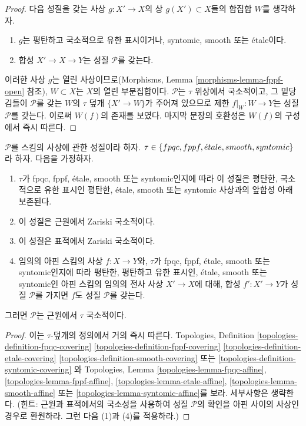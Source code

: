 \begin{proof}
다음 성질을 갖는 사상 $g : X' \to X$의 상 $g(X') \subset X$들의 합집합
$W$를 생각하자.
\begin{enumerate}
\item $g$는 평탄하고 국소적으로 유한 표시이거나, syntomic, smooth 또는
\'etale이다.
\item 합성 $X' \to X \to Y$는 성질 $\mathcal{P}$를 갖는다.
\end{enumerate}
이러한 사상 $g$는 열린 사상이므로(Morphisms, Lemma
\ref{morphisms-lemma-fppf-open} 참조), $W \subset X$는 $X$의 열린
부분집합이다. $\mathcal{P}$는 $\tau$ 위상에서 국소적이고, 그 밑당김들이
$\mathcal{P}$를 갖는 $W$의 $\tau$ 덮개 $\{X' \to W\}$가 주어져
있으므로 제한 $f|_W : W \to Y$는 성질 $\mathcal{P}$를 갖는다. 이로써
$W(f)$의 존재를 보였다. 마지막 문장의 호환성은 $W(f)$의 구성에서 즉시
따른다.
\end{proof}

\begin{lemma}
\label{lemma-properties-morphisms-local-source}
$\mathcal{P}$를 스킴의 사상에 관한 성질이라 하자.
$\tau \in \{fpqc, \linebreak[0] fppf, \linebreak[0]
\etale, \linebreak[0] smooth, \linebreak[0] syntomic\}$라 하자. 다음을
가정하자.
\begin{enumerate}
\item $\tau$가 fpqc, fppf, \'etale, smooth 또는 syntomic인지에 따라 이
성질은 평탄한, 국소적으로 유한 표시인 평탄한, \'etale, smooth 또는
syntomic 사상과의 앞합성 아래 보존된다.
\item 이 성질은 근원에서 Zariski 국소적이다.
\item 이 성질은 표적에서 Zariski 국소적이다.
\item 임의의 아핀 스킴의 사상 $f : X \to Y$와, $\tau$가 fpqc, fppf,
\'etale, smooth 또는 syntomic인지에 따라 평탄한, 평탄하고 유한 표시인,
\'etale, smooth 또는 syntomic인 아핀 스킴의 임의의 전사 사상
$X' \to X$에 대해, 합성 $f' : X' \to Y$가 성질 $\mathcal{P}$를
가지면 $f$도 성질 $\mathcal{P}$를 갖는다.
\end{enumerate}
그러면 $\mathcal{P}$는 근원에서 $\tau$ 국소적이다.
\end{lemma}

\begin{proof}
이는 $\tau$-덮개의 정의에서 거의 즉시 따른다. Topologies, Definition
\ref{topologies-definition-fpqc-covering}
\ref{topologies-definition-fppf-covering}
\ref{topologies-definition-etale-covering}
\ref{topologies-definition-smooth-covering} 또는
\ref{topologies-definition-syntomic-covering}
와 Topologies, Lemma
\ref{topologies-lemma-fpqc-affine},
\ref{topologies-lemma-fppf-affine},
\ref{topologies-lemma-etale-affine},
\ref{topologies-lemma-smooth-affine} 또는
\ref{topologies-lemma-syntomic-affine}를 보라. 세부사항은 생략한다.
(힌트: 근원과 표적에서의 국소성을 사용하여 성질 $\mathcal{P}$의 확인을
아핀 사이의 사상인 경우로 환원하라. 그런 다음 (1)과 (4)를 적용하라.)
\end{proof}

